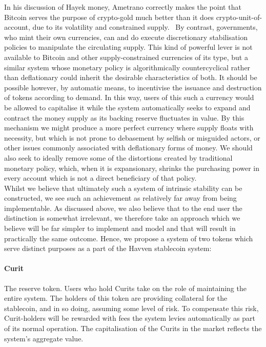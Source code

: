 \documentclass{article}
\begin{document}
\noindent  In his discussion of Hayek money, Ametrano correctly makes the point that Bitcoin serves the purpose of crypto-gold much better than it does crypto-unit-of-account, due to its volatility and constrained supply.~\cite{ametrano2016hayek} By contrast, governments, who mint their own currencies, can and do execute discretionary stabilisation policies to manipulate the circulating supply. This kind of powerful lever is not available to Bitcoin and other supply-constrained currencies of its type, but a similar system whose monetary policy is algorithmically countercyclical rather than deflationary could inherit the desirable characteristics of both. It should be possible however, by automatic means, to incentivise the issuance and destruction of tokens according to demand. In this way, users of this such a currency would be allowed to capitalise it while the system automatically seeks to expand and contract the money supply as its backing reserve fluctuates in value. By this mechanism we might produce a more perfect currency where supply floats with necessity, but which is not prone to debasement by selfish or misguided actors, or other issues commonly associated with deflationary forms of money. We should also seek to ideally remove some of the distortions created by traditional monetary policy, which, when it is expansionary, shrinks the purchasing power in every account which is not a direct beneficiary of that policy.\\

\noindent Whilst we believe that ultimately such a system of intrinsic stability can be constructed, we see such an achievement as relatively far away from being implementable. As discussed above, we also believe that to the end user the distinction is somewhat irrelevant, we therefore take an approach which we believe will be far simpler to implement and model and that will result in practically the same outcome. Hence, we propose a system of two tokens which serve distinct purposes as a part of the Havven stablecoin system:

\paragraph{Curit} The reserve token. Users who hold Curits take on the role of maintaining the entire system. The holders of this token are providing collateral for the stablecoin, and in so doing, assuming some level of risk. To compensate this risk, Curit-holders will be rewarded with fees the system levies automatically as part of its normal operation. The capitalisation of the Curits in the market reflects the system's aggregate value.
\end{document}
